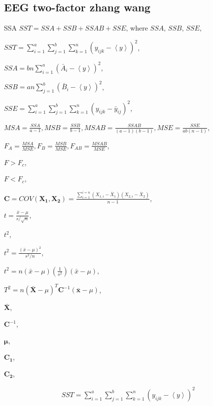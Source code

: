 \documentclass{article}
\begin{document}
\begin{multicols}{2}

\section{EEG two-factor zhang wang}


SSA $SST=SSA+SSB+SSAB+SSE$, where $SSA$, $SSB$, $SSE$,


$SST=\sum\limits_{i=1}^{a}\sum\limits_{j=1}^{b}\sum\limits_{k=1}^{n}\left( y_{ijk}-\left\langle y\right\rangle \right) ^2$,


$SSA=bn\sum\limits_{i=1}^{a}(\bar{A}_i- \left\langle y\right\rangle  )^2$,


$SSB=an\sum\limits_{j=1}^{b}(\bar{B}_i- \left\langle y\right\rangle  )^2$,


$SSE=\sum\limits_{i=1}^{a}\sum\limits_{j=1}^{b}\sum\limits_{k=1}^{n}(y_{ijk}-\bar{y}_{ij})^2$,


$MSA=\frac{SSA}{a-1},MSB=\frac{SSB}{b-1},MSAB=\frac{SSAB}{(a-1)(b-1)},MSE=\frac{SSE}{ab(n-1)}$,


$F_A=\frac{MSA}{MSE},F_B=\frac{MSB}{MSE},F_{AB}=\frac{MSAB}{MSE}$,


$F>F_c$,


$F<F_c$,


$\bm{C}=COV(\bm{X_1,X_2})=\frac{\sum\limits_{i=1}^{i=n}\left( X_{1,i}-\bar{X}_1\right) \left( X_{2,i}-\bar{X}_2 \right)}{n-1} $,


$t=\frac{\bar{x}-\mu}{s/\sqrt{n}}$,


$t^2$,


$t^2=\frac{(\bar{x}-\mu)^2}{s^2/n}$,


$t^2=n(\bar{x}-\mu)\left( \frac{1}{s^2}\right) (\bar{x}-\mu)$,


$T^2=n(\bm{\bar{X}}-\mu)^T\bm{C}^{-1}(\bm{\bar{x}}-\mu)$,


$\bm{\bar{X}}$,


$\bm{C}^{-1}$,


$\bm{\mu}$,


$\bm{C_1}$,


$\bm{C_2}$,
















\begin{align}
SST=\sum_{i=1}^{a}\sum_{j=1}^{b}\sum_{k=1}^{n}\left( y_{ijk}-\left\langle y\right\rangle \right) ^2
\end{align}




\end{multicols}
\end{document}
